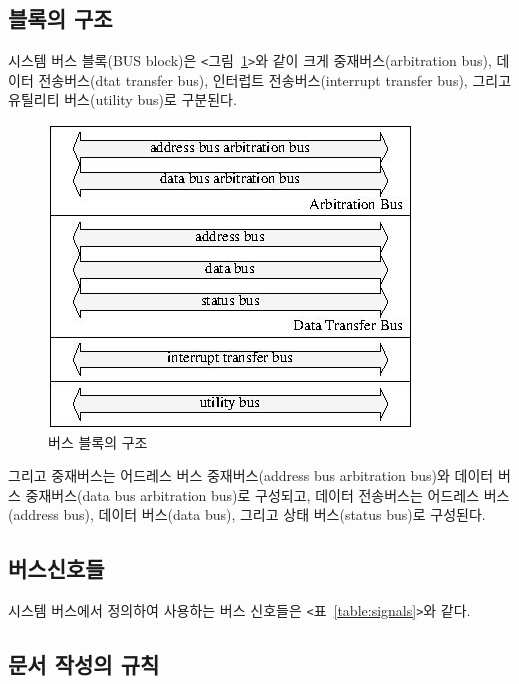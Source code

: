\subsection{블록의 구조}
시스템 버스 블록(BUS block)은 {\tt <}그림~\ref{figure:block}{\tt >}와
같이 크게 중재버스(arbitration bus), 데이터 전송버스(dtat transfer bus),
인터럽트 전송버스(interrupt transfer bus), 그리고 유틸리티 버스(utility bus)로
구분된다.
%
\begin{figure}[htb]
    \centerline{\includegraphics{ch1/FIG/block.jpg}} %
   \caption{버스 블록의 구조}\label{figure:block}
\end{figure}
%
그리고 중재버스는 어드레스 버스 중재버스(address bus arbitration bus)와
데이터 버스 중재버스(data bus arbitration bus)로 구성되고,
데이터 전송버스는 어드레스 버스(address bus), 데이터 버스(data bus),
그리고 상태 버스(status bus)로 구성된다.

\subsection{버스신호들}
시스템 버스에서 정의하여 사용하는 버스 신호들은 {\tt <}표~\ref{table:signals}{\tt >}와
같다.


\subsection{문서 작성의 규칙}

